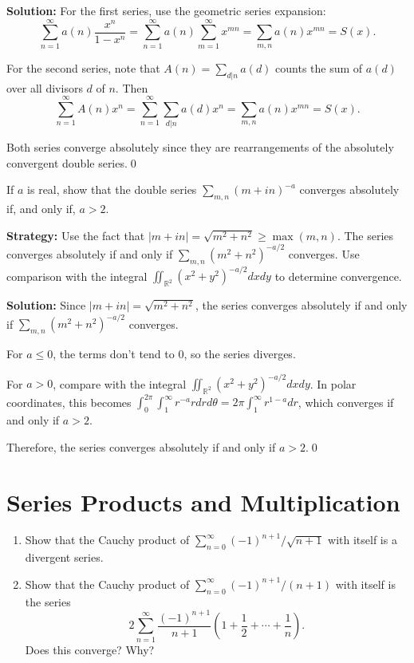 \bigskip\noindent\textbf{Solution:}
For the first series, use the geometric series expansion:
\[\sum_{n=1}^{\infty} a(n) \frac{x^n}{1 - x^n} = \sum_{n=1}^{\infty} a(n) \sum_{m=1}^{\infty} x^{mn} = \sum_{m,n} a(n)x^{mn} = S(x).\]

For the second series, note that \(A(n) = \sum_{d|n} a(d)\) counts the sum of \(a(d)\) over all divisors \(d\) of \(n\). Then
\[\sum_{n=1}^{\infty} A(n)x^n = \sum_{n=1}^{\infty} \sum_{d|n} a(d) x^n = \sum_{m,n} a(n)x^{mn} = S(x).\]

Both series converge absolutely since they are rearrangements of the absolutely convergent double series.\qed



\begin{problembox}
If \(a\) is real, show that the double series \(\sum_{m,n} (m + i n)^{-a}\) converges absolutely if, and only if, \(a > 2\).
\end{problembox}

\noindent\textbf{Strategy:} Use the fact that \(|m + i n| = \sqrt{m^2 + n^2} \geq \max(m,n)\). The series converges absolutely if and only if \(\sum_{m,n} (m^2 + n^2)^{-a/2}\) converges. Use comparison with the integral \(\iint_{\mathbb{R}^2} (x^2 + y^2)^{-a/2} dx dy\) to determine convergence.

\bigskip\noindent\textbf{Solution:}
Since \(|m + i n| = \sqrt{m^2 + n^2}\), the series converges absolutely if and only if \(\sum_{m,n} (m^2 + n^2)^{-a/2}\) converges.

For \(a \leq 0\), the terms don't tend to 0, so the series diverges.

For \(a > 0\), compare with the integral \(\iint_{\mathbb{R}^2} (x^2 + y^2)^{-a/2} dx dy\). In polar coordinates, this becomes \(\int_0^{2\pi} \int_1^{\infty} r^{-a} r dr d\theta = 2\pi \int_1^{\infty} r^{1-a} dr\), which converges if and only if \(a > 2\).

Therefore, the series converges absolutely if and only if \(a > 2\).\qed

\section{Series Products and Multiplication}



\begin{problembox}
\begin{enumerate}[label=\alph*)]
\item Show that the Cauchy product of \(\sum_{n=0}^{\infty} (-1)^{n+1}/\sqrt{n + 1}\) with itself is a divergent series.
\item Show that the Cauchy product of \(\sum_{n=0}^{\infty} (-1)^{n+1}/(n + 1)\) with itself is the series
\[2 \sum_{n=1}^{\infty} \frac{(-1)^{n+1}}{n + 1} \left( 1 + \frac{1}{2} + \cdots + \frac{1}{n} \right).\]
Does this converge? Why?
\end{enumerate}
\end{problembox}

